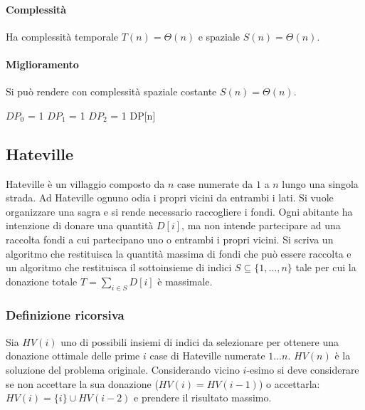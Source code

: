 \paragraph{Complessit\`a}
Ha complessit\`a temporale $T(n)=\Theta(n)$ e spaziale $S(n)=\Theta(n)$.
\paragraph{Miglioramento}
Si pu\`o rendere con complessit\`a spaziale costante $S(n)=\Theta(n)$.
\begin{algorithm}[h]
\DontPrintSemicolon
{}



\SetKwFunction{}{}
\SetKwFunction{}{}
\SetKwFunction{}{}
\SetKwFunction{}{}

\caption{\protect\Int \protect{}}
\Int $DP_0$ = 1\;
\Int $DP_1$ = 1\;
\Int $DP_2$ = 1\;
\Return DP[n]\;
\end{algorithm}
\subsection{Hateville}
Hateville \`e un villaggio composto da $n$ case numerate da $1$ a $n$ lungo una singola strada. Ad Hateville ognuno odia i propri vicini da entrambi i lati. Si vuole organizzare una sagra e si rende necessario
raccogliere i fondi. Ogni abitante ha intenzione di donare una quantit\`a $D[i]$, ma non intende partecipare ad una raccolta fondi a cui partecipano uno o entrambi i propri vicini. Si scriva un algoritmo che 
restituisca la quantit\`a massima di fondi che pu\`o essere raccolta e un algoritmo che restituisca il sottoinsieme di indici $S\subseteq\{1, \dots, n\}$ tale per cui la donazione totale $T=\sum\limits_{i\in S}D[i]$
\`e massimale.
\subsubsection{Definizione ricorsiva}
Sia $HV(i)$ uno di possibili insiemi di indici da selezionare per ottenere una donazione ottimale delle prime $i$ case di Hateville numerate $1\dots n$. $HV(n)$ \`e la soluzione del problema originale. 
Considerando vicino $i$-esimo si deve considerare se non accettare la sua donazione ($HV(i)=HV(i-1)$) o accettarla: $HV(i) = \{i\}\cup HV(i-2)$ e prendere il risultato massimo. 
